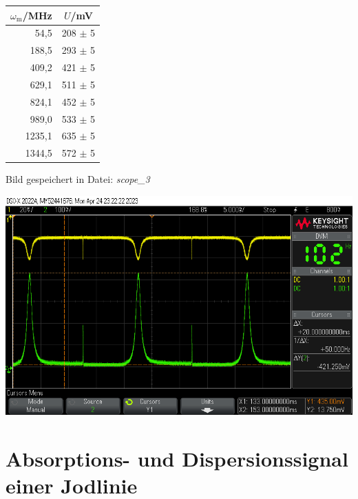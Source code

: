 \begin{center}
    \captionsetup{type=table}
    \begin{tabular}{r | c }
        $\omega_\mathrm{m}$/MHz & $U$/mV \\ \hline
        54,5   & 208 $\pm$ 5 \\
        188,5  & 293 $\pm$ 5 \\
        409,2  & 421 $\pm$ 5 \\
        629,1  & 511 $\pm$ 5 \\
        824,1  & 452 $\pm$ 5 \\
        989,0  & 533 $\pm$ 5 \\
        1235,1 & 635 $\pm$ 5 \\
        1344,5 & 572 $\pm$ 5 \\
    \end{tabular}
    \label{tab:verluste}
\end{center}

Bild gespeichert in Datei: \textit{scope\_3}

\begin{center}
    \captionsetup{type=figure}
    \includegraphics[scale=0.5]{Bilder/Signal-Rausch/scope_3.png}
    \label{fig:verluste}
\end{center}

\section{Absorptions- und Dispersionssignal einer Jodlinie}
\label{sub:jodline}

